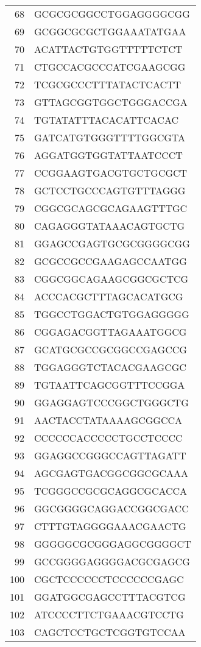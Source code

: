 \documentclass[letterpaper,12pt]{article}
\numberwithin{equation}{appendix}
\begin{document}
{{\begin{table}[ht]
\begin{tabular}{rl}
  68 & GCGCGCGGCCTGGAGGGGCGG \\ 
  69 & GCGGCGCGCTGGAAATATGAA \\ 
  70 & ACATTACTGTGGTTTTTCTCT \\ 
  71 & CTGCCACGCCCATCGAAGCGG \\ 
  72 & TCGCGCCCTTTATACTCACTT \\ 
  73 & GTTAGCGGTGGCTGGGACCGA \\ 
  74 & TGTATATTTACACATTCACAC \\ 
  75 & GATCATGTGGGTTTTGGCGTA \\ 
  76 & AGGATGGTGGTATTAATCCCT \\ 
  77 & CCGGAAGTGACGTGCTGCGCT \\ 
  78 & GCTCCTGCCCAGTGTTTAGGG \\ 
  79 & CGGCGCAGCGCAGAAGTTTGC \\ 
  80 & CAGAGGGTATAAACAGTGCTG \\ 
  81 & GGAGCCGAGTGCGCGGGGCGG \\ 
  82 & GCGCCGCCGAAGAGCCAATGG \\ 
  83 & CGGCGGCAGAAGCGGCGCTCG \\ 
  84 & ACCCACGCTTTAGCACATGCG \\ 
  85 & TGGCCTGGACTGTGGAGGGGG \\ 
  86 & CGGAGACGGTTAGAAATGGCG \\ 
  87 & GCATGCGCCGCGGCCGAGCCG \\ 
  88 & TGGAGGGTCTACACGAAGCGC \\ 
  89 & TGTAATTCAGCGGTTTCCGGA \\ 
  90 & GGAGGAGTCCCGGCTGGGCTG \\ 
  91 & AACTACCTATAAAAGCGGCCA \\ 
  92 & CCCCCCACCCCCTGCCTCCCC \\ 
  93 & GGAGGCCGGGCCAGTTAGATT \\ 
  94 & AGCGAGTGACGGCGGCGCAAA \\ 
  95 & TCGGGCCGCGCAGGCGCACCA \\ 
  96 & GGCGGGGCAGGACCGGCGACC \\ 
  97 & CTTTGTAGGGGAAACGAACTG \\ 
  98 & GGGGGCGCGGGAGGCGGGGCT \\ 
  99 & GCCGGGGAGGGGACGCGAGCG \\ 
  100 & CGCTCCCCCCTCCCCCCGAGC \\ 
  101 & GGATGGCGAGCCTTTACGTCG \\ 
  102 & ATCCCCTTCTGAAACGTCCTG \\ 
  103 & CAGCTCCTGCTCGGTGTCCAA \\ 

\end{tabular}
\end{table}}}
\end{document}

